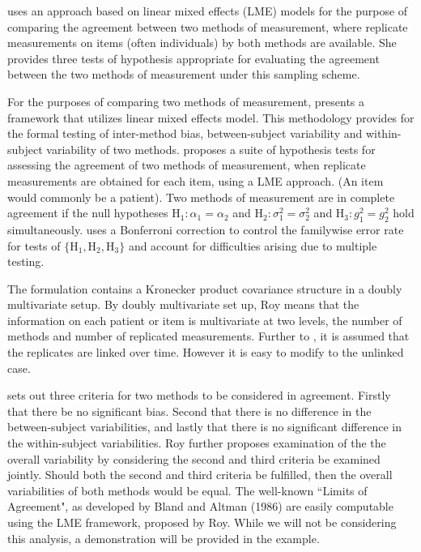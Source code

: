 \documentclass[12pt, a4paper]{report}
\theoremstyle{plain}
\theoremstyle{definition}
\theoremstyle{remark}
\begin{document}
\citet{ARoy2009} uses an approach based on linear mixed effects (LME) models for the purpose of comparing the agreement between two methods of measurement, where replicate measurements on items (often individuals) by both methods are available. She provides three tests of hypothesis appropriate for evaluating the agreement between the two methods of measurement under this sampling scheme. 

For the purposes of comparing two methods of measurement, \citet{ARoy2009} presents a framework that utilizes linear mixed effects model. This methodology provides for the formal testing of inter-method bias, between-subject variability and within-subject variability of two methods. \citet{ARoy2009} proposes a suite of hypothesis tests for assessing the agreement of two methods of measurement, when replicate measurements are obtained for each item, using a LME approach. (An item would commonly be a patient).  
Two methods of measurement are in complete agreement if the null hypotheses $\mathrm{H}_1\colon \alpha_1 = \alpha_2$ and $\mathrm{H}_2\colon \sigma^2_1 = \sigma^2_2 $ and $\mathrm{H}_3\colon g^2_1= g^2_2$ hold simultaneously. \citet{ARoy2009} uses a Bonferroni correction to control the familywise error rate for tests of $\{\mathrm{H}_1, \mathrm{H}_2, \mathrm{H}_3\}$ and account for difficulties arising due to multiple testing. 

The formulation contains a Kronecker product covariance structure in a doubly multivariate setup. By doubly multivariate set up, Roy means that the information on each patient or item is multivariate at two levels, the number of methods and number of replicated measurements. Further to \citet{lam}, it is assumed that the replicates are linked over time. However it is easy to modify to the unlinked case.

\citet{ARoy2009} sets out three criteria for two methods to be considered in agreement. Firstly that there be no significant bias. Second that there is no difference in the between-subject variabilities, and lastly that there is no significant difference in the within-subject variabilities. Roy further proposes examination of the the overall variability by considering the second and third criteria be examined jointly. Should both the second and third criteria be fulfilled, then the overall variabilities of both methods would be equal.
The well-known ``Limits of Agreement", as developed by Bland and Altman (1986) are easily computable using the LME framework, proposed by Roy. While we will not be considering this analysis, a demonstration will be provided in the example.
\end{document}
